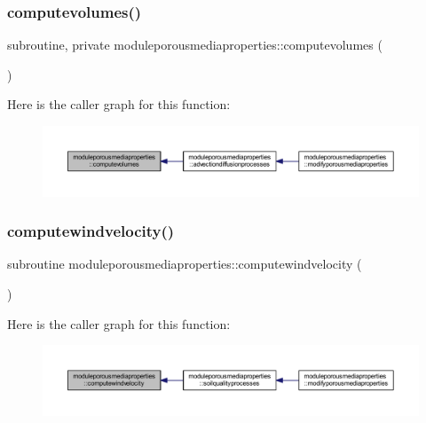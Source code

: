 \subsubsection{\texorpdfstring{computevolumes()}{computevolumes()}}
{\footnotesize\ttfamily subroutine, private moduleporousmediaproperties\+::computevolumes (\begin{DoxyParamCaption}{ }\end{DoxyParamCaption})\hspace{0.3cm}{\ttfamily [private]}}

Here is the caller graph for this function\+:\nopagebreak
\begin{figure}[H]
\begin{center}
\leavevmode
\includegraphics[width=350pt]{namespacemoduleporousmediaproperties_a8fba489b1d7b502e23196a791d678e03_icgraph}
\end{center}
\end{figure}
\mbox{\label{namespacemoduleporousmediaproperties_aad02f0ad0e6d8ad5f7cd959e38c17fa7}} 
\subsubsection{\texorpdfstring{computewindvelocity()}{computewindvelocity()}}
{\footnotesize\ttfamily subroutine moduleporousmediaproperties\+::computewindvelocity (\begin{DoxyParamCaption}{ }\end{DoxyParamCaption})\hspace{0.3cm}{\ttfamily [private]}}

Here is the caller graph for this function\+:\nopagebreak
\begin{figure}[H]
\begin{center}
\leavevmode
\includegraphics[width=350pt]{namespacemoduleporousmediaproperties_aad02f0ad0e6d8ad5f7cd959e38c17fa7_icgraph}
\end{center}
\end{figure}
\mbox{\label{namespacemoduleporousmediaproperties_a3cb901c1fa6f5b569ff3841c39531ce5}} 
